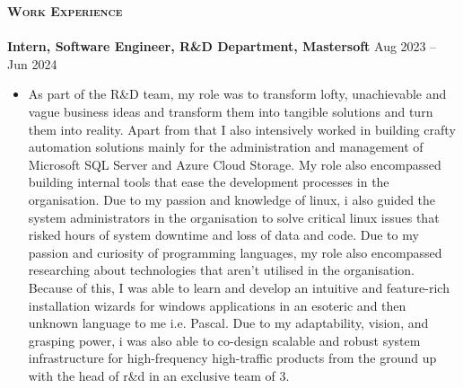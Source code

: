\documentclass[a4paper]{article}
\newcommand{\lineunder} {
\vspace*{-8pt} \\
\hspace*{-18pt} \hrulefill \\
}
\newcommand{\header}[1]{%
{\hspace*{-18pt}\vspace*{6pt} \textsc{\textbf{\Large{#1}}}}%
\vspace*{-6pt} \lineunder
}
\begin{document}
\header{Work Experience}
\vspace{1mm}
\textbf{Intern, Software Engineer, R\&D Department, Mastersoft} \hfill Aug 2023 -- Jun 2024 \\
\vspace{-1mm}
\begin{itemize}

    \item As part of the R\&D team, my role was to transform lofty, unachievable and vague
    business ideas and transform them into tangible solutions and turn them into reality.
    Apart from that I also intensively worked in building crafty automation solutions
    mainly for the administration and management of Microsoft SQL Server and Azure Cloud Storage.
    My role also encompassed building internal tools that ease the development processes in the
    organisation.
    Due to my passion and knowledge of linux, i also guided the system administrators in the
    organisation to solve critical linux issues that risked hours of system downtime and loss
    of data and code.
    Due to my passion and curiosity of programming languages, my role also encompassed
    researching about technologies that aren't utilised in the organisation.
    Because of this, I was able to learn and develop an intuitive and feature-rich installation wizards
    for windows applications in an esoteric and then unknown language to me i.e. Pascal.
    Due to my adaptability, vision, and grasping power, i was also able to co-design scalable and robust
    system infrastructure for high-frequency high-traffic products from the ground up with the head of
    r&d in an exclusive team of 3.
\end{itemize}
\end{document}
